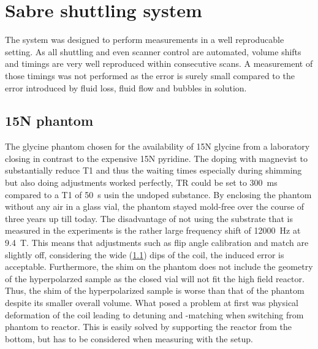     \section{Sabre shuttling system}
        The system was designed to perform measurements in a well reproducable setting. As all shuttling and even scanner control are automated, volume shifts and timings are very well reproduced within consecutive scans. A measurement of those timings was not performed as the error is surely small compared to the error introduced by fluid loss, fluid flow and bubbles in solution.
        \subsection{15N phantom}
            The glycine phantom chosen for the availability of 15N glycine from a laboratory closing in contrast to the expensive 15N pyridine. The doping with magnevist to substantially reduce T1 and thus the waiting times especially during shimming but also doing adjustments worked perfectly, TR could be set to \SI{300}{\milli\second} compared to a T1 of \SI{50}{\second} usin the undoped substance.
            By enclosing the phantom without any air in a glass vial, the phantom stayed mold-free over the course of three years up till today.
            The disadvantage of not using the substrate that is measured in the experiments is the rather large frequency shift of \SI{12000}{\hertz} at \SI{9.4}{\tesla}. This means that adjustments such as flip angle calibration and match are slightly off, considering the wide (\ref{}) dips of the coil, the induced error is acceptable.
            Furthermore, the shim on the phantom does not include the geometry of the hyperpolarzed sample as the closed vial will not fit the high field reactor. Thus, the shim of the hyperpolarized sample is worse than that of the phantom despite its smaller overall volume.
            What posed a problem at first was physical deformation of the coil leading to detuning and -matching when switching from phantom to reactor. This is easily solved by supporting the reactor from the bottom, but has to be considered when measuring with the setup.
